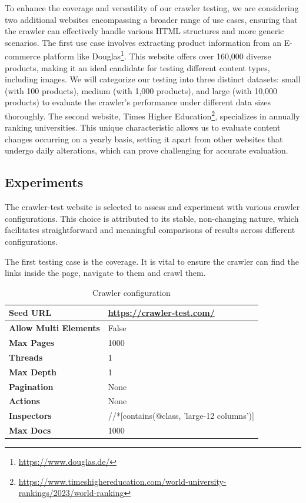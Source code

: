 {To enhance the coverage and versatility of our crawler testing, we are considering two additional websites encompassing a broader range of use cases, ensuring that the crawler can effectively handle various HTML structures and more generic scenarios.
The first use case involves extracting product information from an E-commerce platform like Douglas\footnote{\url{https://www.douglas.de/}}. This website offers over 160,000 diverse products, making it an ideal candidate for testing different content types, including images. We will categorize our testing into three distinct datasets: small (with 100 products), medium (with 1,000 products), and large (with 10,000 products) to evaluate the crawler's performance under different data sizes thoroughly.
The second website, Times Higher Education\footnote{\url{https://www.timeshighereducation.com/world-university-rankings/2023/world-ranking}}, specializes in annually ranking universities. This unique characteristic allows us to evaluate content changes occurring on a yearly basis, setting it apart from other websites that undergo daily alterations, which can prove challenging for accurate evaluation.

\subsection{Experiments}
The crawler-test website is selected to assess and experiment with various crawler configurations. This choice is attributed to its stable, non-changing nature, which facilitates straightforward and meaningful comparisons of results across different configurations.
 
The first testing case is the coverage. It is vital to ensure the crawler can find the links inside the page, navigate to them and crawl them. 

\begin{table}[ht] 
{\footnotesize
\begin{tabular}{ P{3cm} ||P{10.1cm}  }      %
 \hline \hline
\textbf{Seed URL} & \href{https://crawler-test.com/}{https://crawler-test.com/}\T\B 
\\ 
\hline
\textbf{Allow Multi Elements} & False \T\B 
\\ 
\hline
\textbf{Max Pages} & 1000\T\B 
\\ 
\hline
\textbf{Threads} & 1\T\B 
\\ 
\hline
\textbf{Max Depth} & 1\T\B 
\\ 
\hline
\textbf{Pagination} & None\T\B 
\\ 
\hline
\textbf{Actions} & None\T\B 
\\ 
\hline
\textbf{Inspectors} & //*[contains(@class, 'large-12 columns')]\T\B 
\\ 
\hline
\textbf{Max Docs} & 1000\T\B 
\\ 
\hline \hline
    \end{tabular}
}
  \captionsetup{justification=centering,margin=2cm}
  \caption{Crawler configuration}
\end{table}



}
